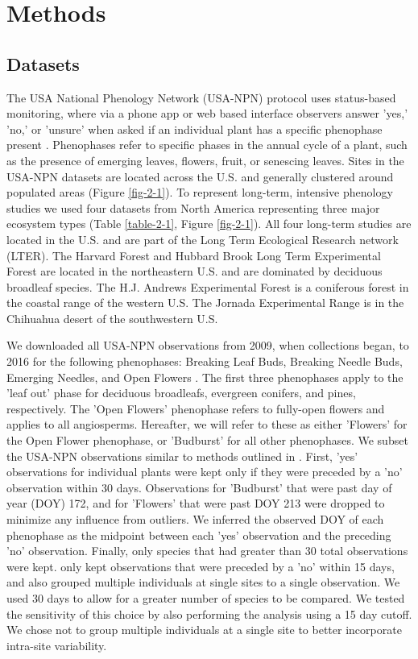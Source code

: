 \section{Methods}

\subsection{Datasets}

The USA National Phenology Network (USA-NPN) protocol uses status-based monitoring, where via a phone app or web based interface observers answer 'yes,' 'no,' or 'unsure' when asked if an individual plant has a specific phenophase present \citep{denny2014}. Phenophases refer to specific phases in the annual cycle of a plant, such as the presence of emerging leaves, flowers, fruit, or senescing leaves. Sites in the USA-NPN datasets are located across the U.S. and generally clustered around populated areas (Figure \ref{fig-2-1}). To represent long-term, intensive phenology studies we used four datasets from North America representing three major ecosystem types (Table \ref{table-2-1}, Figure \ref{fig-2-1}). All four long-term studies are located in the U.S. and are part of the Long Term Ecological Research network (LTER). The Harvard Forest and Hubbard Brook Long Term Experimental Forest are located in the northeastern U.S. and are dominated by deciduous broadleaf species. The H.J. Andrews Experimental Forest is a coniferous forest in the coastal range of the western U.S. The Jornada Experimental Range is in the Chihuahua desert of the southwestern U.S. 

We downloaded all USA-NPN observations from 2009, when collections began, to 2016 for the following phenophases: Breaking Leaf Buds, Breaking Needle Buds, Emerging Needles, and Open Flowers \citep{npndata}. The first three phenophases apply to the 'leaf out' phase for deciduous broadleafs, evergreen conifers, and pines, respectively. The 'Open Flowers' phenophase refers to fully-open flowers and applies to all angiosperms. Hereafter, we will refer to these as either 'Flowers' for the Open Flower phenophase, or 'Budburst' for all other phenophases. We subset the USA-NPN observations similar to methods outlined in \cite{crimmins2017}. First, 'yes' observations for individual plants were kept only if they were preceded by a 'no' observation within 30 days. Observations for 'Budburst' that were past day of year (DOY) 172, and for 'Flowers' that were past DOY 213 were dropped to minimize any influence from outliers. We inferred the observed DOY of each phenophase as the midpoint between each 'yes' observation and the preceding 'no' observation. Finally, only species that had greater than 30 total observations were kept. \cite{crimmins2017} only kept observations that were preceded by a 'no' within 15 days, and also grouped multiple individuals at single sites to a single observation. We used 30 days to allow for a greater number of species to be compared. We tested the sensitivity of this choice by also performing the analysis using a 15 day cutoff. We chose not to group multiple individuals at a single site to better incorporate intra-site variability.

